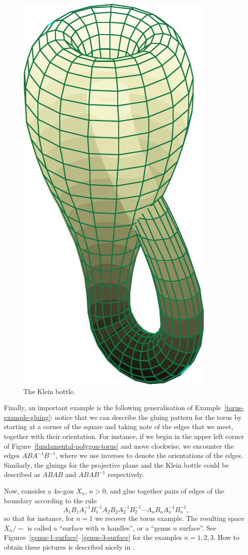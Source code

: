 \begin{figure}
\begin{minipage}{.45\textwidth}
\end{minipage}
\begin{minipage}{.45\textwidth}
  \centering
  \includegraphics[width=.4\linewidth]{images/figure-klein}
  \caption{The Klein bottle.}
  \label{figure-klein}
\end{minipage}
\end{figure}
\begin{example}
  \label{surface-example}
  Finally, an important example is the following generalisation of Example~\ref{torus-example-gluing}: notice that we can describe the gluing pattern for the torus by starting at a corner of the square and taking note of the edges that we meet, together with their orientation. For instance, if we begin in the upper left corner of Figure~\ref{fundamental-polygon-torus} and move clockwise, we encounter the edges $ABA^{-1}B^{-1}$, where we use inverses to denote the orientations of the edges. Similarly, the gluings for the projective plane and the Klein bottle could be described as $ABAB$ and $ABAB^{-1}$ respectively.
  
  Now, consider a $4n$-gon $X_n$, $n > 0$, and glue together pairs of edges of the boundary according to the rule
  \[
    A_1 B_1 A_1^{-1} B_1^{-1} A_2 B_2 A_2^{-1} B_2^{-1} \cdots A_n B_n A_n^{-1} B_n^{-1},
  \]
  so that for instance, for $n = 1$ we recover the torus example. The resulting space $X_n / \!\sim$ is called a ``surface with $n$ handles'', or a ``genus $n$ surface''. See Figures~\ref{genus-1-surface}--\ref{genus-3-surface} for the examples $n = 1, 2, 3$. How to obtain these pictures is described nicely in \cite[Sect.~3.3]{Fje}.
\end{example}
